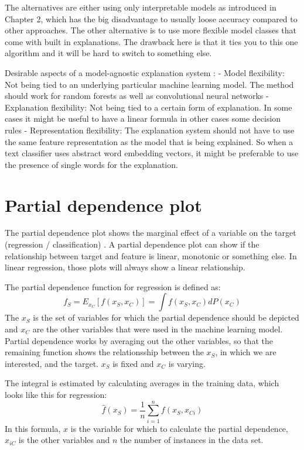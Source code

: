 \documentclass[12pt,]{krantz}
\theoremstyle{definition}
\theoremstyle{definition}
\theoremstyle{definition}
\theoremstyle{remark}
\begin{document}
The alternatives are either using only interpretable models as
introduced in Chapter 2, which has the big disadvantage to usually loose
accuracy compared to other approaches. The other alternative is to use
more flexible model classes that come with built in explanations. The
drawback here is that it ties you to this one algorithm and it will be
hard to switch to something else.

Desirable aspects of a model-agnostic explanation system
\citep{Ribeiro2016b}: - Model flexibility: Not being tied to an
underlying particular machine learning model. The method should work for
random forests as well as convolutional neural networks - Explanation
flexibility: Not being tied to a certain form of explanation. In some
cases it might be useful to have a linear formula in other cases some
decision rules - Representation flexibility: The explanation system
should not have to use the same feature representation as the model that
is being explained. So when a text classifier uses abstract word
embedding vectors, it might be preferable to use the presence of single
words for the explanation.

\section{Partial dependence plot}\label{pdp}

The partial dependence plot shows the marginal effect of a variable on
the target (regression / classification) \citep{friedman2001greedy}. A
partial dependence plot can show if the relationship between target and
feature is linear, monotonic or something else. In linear regression,
those plots will always show a linear relationship.

The partial dependence function for regression is defined as:
\[f_S = E_{x_C}[f(x_S, x_C)] = \int f(x_S, x_C) dP(x_C)\] The \(x_S\) is
the set of variables for which the partial dependence should be depicted
and \(x_C\) are the other variables that were used in the machine
learning model. Partial dependence works by averaging out the other
variables, so that the remaining function shows the relationsship
between the \(x_S\), in which we are interested, and the target. \(x_S\)
is fixed and \(x_C\) is varying.

The integral is estimated by calculating averages in the training data,
which looks like this for regression:
\[ \hat{f}(x_S) = \frac{1}{n} \sum_{i=1}^n f(x_S, x_{Ci}) \] In this
formula, \(x\) is the variable for which to calculate the partial
dependence, \(x_{iC}\) is the other variables and \(n\) the number of
instances in the data set.
\end{document}
